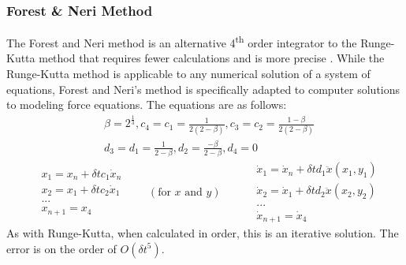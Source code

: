 \documentclass[preprint,titlepage,preprintnumbers,amsmath,amssymb,aps,11pt]{revtex4-2}
\begin{document}
\subsubsection{Forest \& Neri Method}\label{sec:forestneri}
The Forest and Neri method  is an alternative 4\textsuperscript{th} order integrator to the Runge-Kutta method that requires fewer calculations and is more precise \cite[pp. 60-61]{Kinoshita1990}. While the Runge-Kutta method is applicable to any numerical solution of a system of equations, Forest and Neri's method is specifically adapted to computer solutions to modeling force equations. The equations are as follows:
\begin{equation}
    \begin{aligned}
         & \beta=2^\frac{1}{3}, c_4=c_1=\frac{1}{2(2-\beta)}, c_3=c_2=\frac{1-\beta}{2(2-\beta)} \\
         & d_3=d_1=\frac{1}{2-\beta}, d_2=\frac{-\beta}{2-\beta}, d_4=0
    \end{aligned}
\end{equation}
\begin{equation}
    \begin{split}
        &x_1=x_n+ \delta tc_1 \dot{x}_n\\
        &x_2=x_1+ \delta tc_2 \dot{x}_1\\
        &...\\
        &x_{n+1}=x_4
    \end{split}
    \qquad(\text{for }x\text{ and } y)\qquad
    \begin{split}
        &\dot{x}_1=\dot{x}_n+\delta td_1\ddot{x}(x_1,y_1)\\
        &\dot{x}_2=\dot{x}_1+\delta td_2\ddot{x}(x_2,y_2)\\
        &...\\
        &\dot{x}_{n+1}=\dot{x}_4
    \end{split}
    \label{eq:forestandneri}
\end{equation}
As with Runge-Kutta, when calculated in order, this is an iterative solution. The error is on the order of $O(\delta t^5)$.
\end{document}
